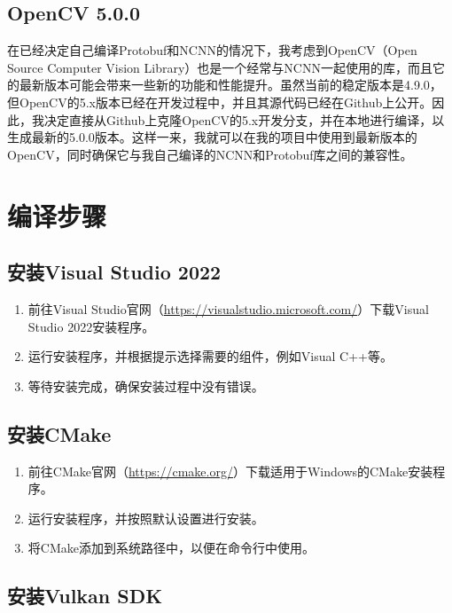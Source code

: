 \subsection{OpenCV 5.0.0}

在已经决定自己编译Protobuf和NCNN的情况下，我考虑到OpenCV（Open Source Computer Vision Library）也是一个经常与NCNN一起使用的库，而且它的最新版本可能会带来一些新的功能和性能提升。虽然当前的稳定版本是4.9.0，但OpenCV的5.x版本已经在开发过程中，并且其源代码已经在Github上公开。因此，我决定直接从Github上克隆OpenCV的5.x开发分支，并在本地进行编译，以生成最新的5.0.0版本。这样一来，我就可以在我的项目中使用到最新版本的OpenCV，同时确保它与我自己编译的NCNN和Protobuf库之间的兼容性。

\section{编译步骤}

\subsection{安装Visual Studio 2022}

\begin{enumerate}
	\item 前往Visual Studio官网（\url{https://visualstudio.microsoft.com/}）下载Visual Studio 2022安装程序。
	\item 运行安装程序，并根据提示选择需要的组件，例如Visual C++等。
	\item 等待安装完成，确保安装过程中没有错误。
\end{enumerate}

\subsection{安装CMake}

\begin{enumerate}
	\item 前往CMake官网（\url{https://cmake.org/}）下载适用于Windows的CMake安装程序。
	\item 运行安装程序，并按照默认设置进行安装。
	\item 将CMake添加到系统路径中，以便在命令行中使用。
\end{enumerate}

\subsection{安装Vulkan SDK}

